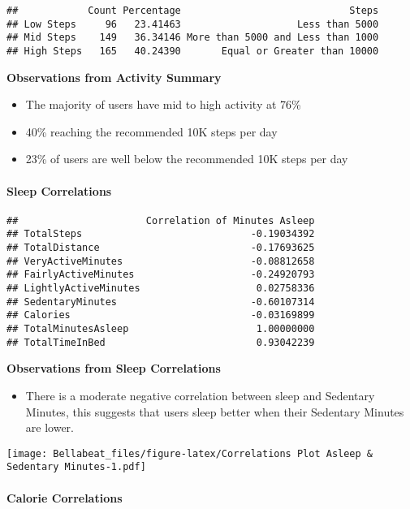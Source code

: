 \documentclass[
]{article}
\providecommand{\tightlist}{%
  \setlength{\itemsep}{0pt}\setlength{\parskip}{0pt}}
\begin{document}
\begin{verbatim}
##            Count Percentage                             Steps
## Low Steps     96   23.41463                    Less than 5000
## Mid Steps    149   36.34146 More than 5000 and Less than 1000
## High Steps   165   40.24390       Equal or Greater than 10000
\end{verbatim}

\textbf{Observations from Activity Summary}

\begin{itemize}
\tightlist
\item
  The majority of users have mid to high activity at 76\%
\item
  40\% reaching the recommended 10K steps per day
\item
  23\% of users are well below the recommended 10K steps per day
\end{itemize}

\paragraph{\texorpdfstring{\textbf{Sleep
Correlations}}{Sleep Correlations}}\label{sleep-correlations}

\begin{verbatim}
##                      Correlation of Minutes Asleep
## TotalSteps                             -0.19034392
## TotalDistance                          -0.17693625
## VeryActiveMinutes                      -0.08812658
## FairlyActiveMinutes                    -0.24920793
## LightlyActiveMinutes                    0.02758336
## SedentaryMinutes                       -0.60107314
## Calories                               -0.03169899
## TotalMinutesAsleep                      1.00000000
## TotalTimeInBed                          0.93042239
\end{verbatim}

\textbf{Observations from Sleep Correlations}

\begin{itemize}
\tightlist
\item
  There is a moderate negative correlation between sleep and Sedentary
  Minutes, this suggests that users sleep better when their Sedentary
  Minutes are lower.
\end{itemize}

\texttt{[image: Bellabeat\_files/figure-latex/Correlations Plot Asleep \& Sedentary Minutes-1.pdf]}

\paragraph{\texorpdfstring{\textbf{Calorie
Correlations}}{Calorie Correlations}}\label{calorie-correlations}
\end{document}
